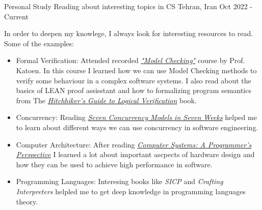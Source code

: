 \begin{cventries}
  \cventry
  {Personal Study} %
  {Reading about interesting topics in CS} %
  {Tehran, Iran} %
  {Oct 2022 - Current} %
  {
    \begin{cvitems} %
    \item {In order to deepen my knowlege, I always look for interesting resources to read.
        Some of the examples:
        \begin{itemize}
        \item  Formal Verification: \newline
          Attended recorded \href{https://www.youtube.com/playlist?list=PLwabKnOFhE38C0o6z_bhlF_uOUlblDTjh}{\textit{"Model Checking"}} course by Prof. Katoen. In this course I learned how we can use Model Checking methods to verify some behaviour in a complex software systems.
          \newline
          I also read about the basics of LEAN proof assisstant and how to formalizing program semantics from The \href{https://github.com/blanchette/logical_verification_2023}{\textit{Hitchhiker’s Guide to Logical Verification}} book.
        \item  Concurrency: \newline
          Reading \href{https://pragprog.com/titles/pb7con/seven-concurrency-models-in-seven-weeks/}{\textit{Seven Concurrency Models in Seven Weeks}} helped me to learn about different ways we can use concurrency in software engineering.
        \item Computer Architecture:
          \newline
          After reading
          \href{http://csapp.cs.cmu.edu/2e/samples.html}{\textit{
              Computer Systems: A Programmer's Perspective}} I learned a lot about important ascpects of hardware design and how they can be used to achieve high performance in software.
        \item Programming Languages:
          \newline
          Interesing books like \textit{SICP} and \textit{Crafting Interpreters} helpled me to get deep knowledge in programming languages theory.
        \end{itemize}
      }
    \end{cvitems}
  }

\end{cventries}
